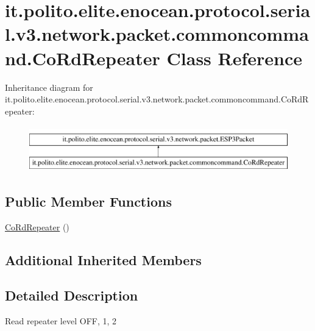 \hypertarget{classit_1_1polito_1_1elite_1_1enocean_1_1protocol_1_1serial_1_1v3_1_1network_1_1packet_1_1commoncommand_1_1_co_rd_repeater}{}\section{it.\+polito.\+elite.\+enocean.\+protocol.\+serial.\+v3.\+network.\+packet.\+commoncommand.\+Co\+Rd\+Repeater Class Reference}
\label{classit_1_1polito_1_1elite_1_1enocean_1_1protocol_1_1serial_1_1v3_1_1network_1_1packet_1_1commoncommand_1_1_co_rd_repeater}
Inheritance diagram for it.\+polito.\+elite.\+enocean.\+protocol.\+serial.\+v3.\+network.\+packet.\+commoncommand.\+Co\+Rd\+Repeater\+:\begin{figure}[H]
\begin{center}
\leavevmode
\includegraphics[height=2.000000cm]{classit_1_1polito_1_1elite_1_1enocean_1_1protocol_1_1serial_1_1v3_1_1network_1_1packet_1_1commoncommand_1_1_co_rd_repeater}
\end{center}
\end{figure}
\subsection*{Public Member Functions}
\begin{DoxyCompactItemize}
\item 
\hyperlink{classit_1_1polito_1_1elite_1_1enocean_1_1protocol_1_1serial_1_1v3_1_1network_1_1packet_1_1commoncommand_1_1_co_rd_repeater_a8ff2d8a15faca7687de82b60a8b6dc27}{Co\+Rd\+Repeater} ()
\end{DoxyCompactItemize}
\subsection*{Additional Inherited Members}


\subsection{Detailed Description}
Read repeater level O\+FF, 1, 2

